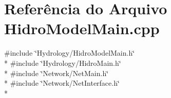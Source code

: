 \section{Referência do Arquivo Hidro\+Model\+Main.\+cpp}
\label{_hidro_model_main_8cpp}
{\ttfamily \#include \char`\"{}Hydrology/\+Hidro\+Model\+Main.\+h\char`\"{}}\\*
{\ttfamily \#include \char`\"{}Hydrology/\+Hidro\+Main.\+h\char`\"{}}\\*
{\ttfamily \#include \char`\"{}Network/\+Net\+Main.\+h\char`\"{}}\\*
{\ttfamily \#include \char`\"{}Network/\+Net\+Interface.\+h\char`\"{}}\\*
